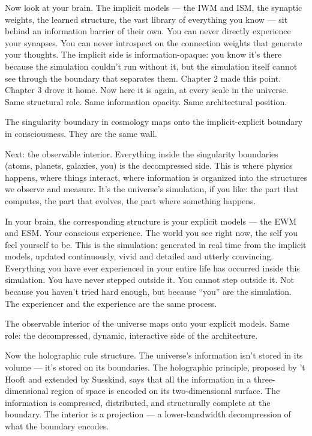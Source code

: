 \documentclass[11pt, twoside, openright]{book}
\begin{document}
Now look at your brain. The implicit models --- the IWM and ISM, the synaptic weights, the learned structure, the vast library of everything you know --- sit behind an information barrier of their own. You can never directly experience your synapses. You can never introspect on the connection weights that generate your thoughts. The implicit side is information-opaque: you know it's there because the simulation couldn't run without it, but the simulation itself cannot see through the boundary that separates them. Chapter 2 made this point. Chapter 3 drove it home. Now here it is again, at every scale in the universe. Same structural role. Same information opacity. Same architectural position.

The singularity boundary in cosmology maps onto the implicit-explicit boundary in consciousness. They are the same wall.

Next: the observable interior. Everything inside the singularity boundaries (atoms, planets, galaxies, you) is the decompressed side. This is where physics happens, where things interact, where information is organized into the structures we observe and measure. It's the universe's simulation, if you like: the part that computes, the part that evolves, the part where something happens.

In your brain, the corresponding structure is your explicit models --- the EWM and ESM. Your conscious experience. The world you see right now, the self you feel yourself to be. This is the simulation: generated in real time from the implicit models, updated continuously, vivid and detailed and utterly convincing. Everything you have ever experienced in your entire life has occurred inside this simulation. You have never stepped outside it. You cannot step outside it. Not because you haven't tried hard enough, but because ``you'' are the simulation. The experiencer and the experience are the same process.

The observable interior of the universe maps onto your explicit models. Same role: the decompressed, dynamic, interactive side of the architecture.

Now the holographic rule structure. The universe's information isn't stored in its volume --- it's stored on its boundaries. The holographic principle, proposed by 't Hooft and extended by Susskind, says that all the information in a three-dimensional region of space is encoded on its two-dimensional surface. The information is compressed, distributed, and structurally complete at the boundary. The interior is a projection --- a lower-bandwidth decompression of what the boundary encodes.
\end{document}
